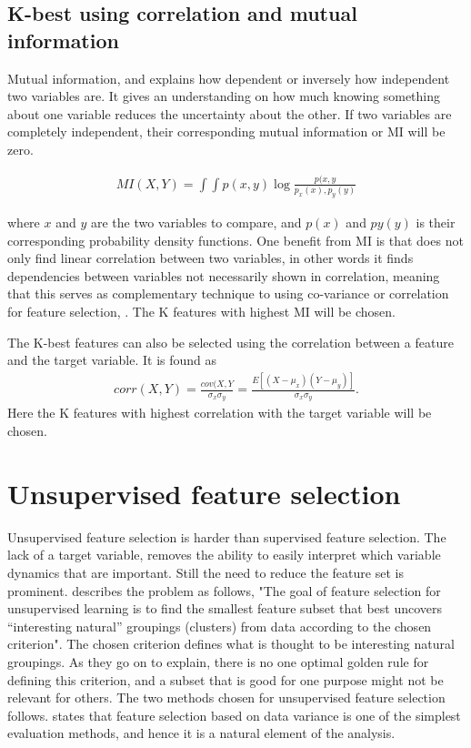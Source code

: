     
    \subsection{K-best using correlation and  mutual information}\label{subsec:K-best_feat_select}
    
        Mutual information, \cite{Kraskov2004} and \cite{Peng2005} explains how dependent or inversely how independent two variables are. It gives an understanding on how much knowing something about one variable reduces the uncertainty about the other. If two variables are completely independent, their corresponding mutual information or MI will be zero. 
        
        \begin{align}\label{eq:tech_MI}
                MI(X,Y) = \int \int p(x,y) \log \frac{p(x,y}{p_x(x),p_y(y)}
        \end{align}
        
        where $x$ and $y$ are the two variables to compare, and $p(x)$ and $py(y)$ is their corresponding probability density functions. One benefit from MI is that does not only find linear correlation between two variables, in other words it finds dependencies between variables not necessarily shown in correlation, meaning that this serves as complementary technique to using co-variance or correlation for feature selection, \cite{Li}. The K features with highest MI will be chosen. 
        
        
        The K-best features can also be selected using the correlation between a feature and the target variable. It is found as  
        \begin{align}
            corr(X,Y) = \frac{cov(X,Y}{\sigma_x\sigma_y} = \frac{E[(X-\mu_x)(Y-\mu_y)]}{\sigma_x\sigma_y}.
        \end{align}
        Here the K features with highest correlation with the target variable will be chosen. 
        
\section{Unsupervised feature selection}\label{sec:unsup_feat_reduc}
    Unsupervised feature selection is harder than supervised feature selection. The lack of a target variable, removes the ability to easily interpret which variable dynamics that are important. Still the need to reduce the feature set is prominent. \cite{Dy2004} describes the problem as follows, "The goal of feature selection for unsupervised learning is to find the smallest feature subset that best uncovers “interesting natural” groupings (clusters) from data according to the chosen criterion". The chosen criterion defines what is thought to be interesting natural groupings. As they go on to explain, there is no one optimal golden rule for defining this criterion, and a subset that is good for one purpose might not be relevant for others. The two methods chosen for unsupervised feature selection follows. \cite{He2005} states that feature selection based on data variance is one of the simplest evaluation methods, and hence it is a natural element of the analysis. 
    
